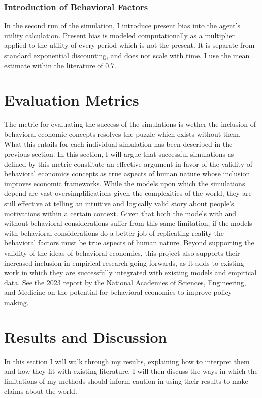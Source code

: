 \documentclass[10pt,twocolumn]{article}
\begin{document}
\subsubsection{Introduction of Behavioral Factors}
In the second run of the simulation, I introduce present bias into the agent's utility calculation. Present bias is modeled computationally as a multiplier applied to the utility of every period which is not the present. It is separate from standard exponential discounting, and does not scale with time. I use the mean estimate within the literature of 0.7.

\section{Evaluation Metrics}
The metric for evaluating the success of the simulations is wether the inclusion of behavioral economic concepts resolves the puzzle which exists without them. What this entails for each individual simulation has been described in the previous section. In this section, I will argue that successful simulations as defined by this metric constitute an effective argument in favor of the validity of behavioral economics concepts as true aspects of human nature whose inclusion improves economic frameworks. While the models upon which the simulations depend are vast oversimplifications given the complexities of the world, they are still effective at telling an intuitive and logically valid story about people’s motivations within a certain context. Given that both the models with and without behavioral considerations suffer from this same limitation, if the models with behavioral considerations do a better job of replicating reality the behavioral factors must be true aspects of human nature. Beyond supporting the validity of the ideas of behavioral economics, this project also supports their increased inclusion in empirical research going forwards, as it adds to existing work in which they are successfully integrated with existing models and empirical data. See the 2023 report by the National Academies of Sciences, Engineering, and Medicine on the potential for behavioral economics to improve policy-making.\cite{report23} 

\section{Results and Discussion}
In this section I will walk through my results, explaining how to interpret them and how they fit with existing literature. I will then discuss the ways in which the limitations of my methods should inform caution in using their results to make claims about the world.  
\end{document}
